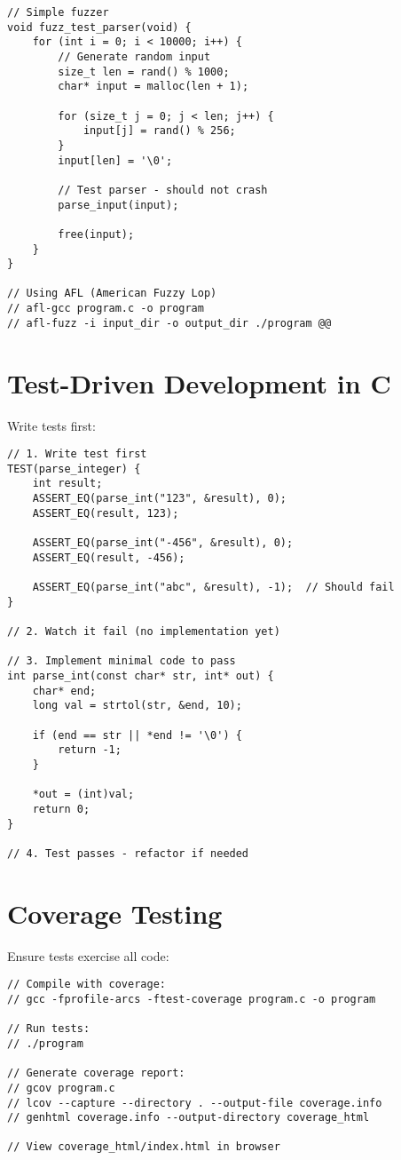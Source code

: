 \begin{lstlisting}
// Simple fuzzer
void fuzz_test_parser(void) {
    for (int i = 0; i < 10000; i++) {
        // Generate random input
        size_t len = rand() % 1000;
        char* input = malloc(len + 1);

        for (size_t j = 0; j < len; j++) {
            input[j] = rand() % 256;
        }
        input[len] = '\0';

        // Test parser - should not crash
        parse_input(input);

        free(input);
    }
}

// Using AFL (American Fuzzy Lop)
// afl-gcc program.c -o program
// afl-fuzz -i input_dir -o output_dir ./program @@
\end{lstlisting}

\section{Test-Driven Development in C}

Write tests first:

\begin{lstlisting}
// 1. Write test first
TEST(parse_integer) {
    int result;
    ASSERT_EQ(parse_int("123", &result), 0);
    ASSERT_EQ(result, 123);

    ASSERT_EQ(parse_int("-456", &result), 0);
    ASSERT_EQ(result, -456);

    ASSERT_EQ(parse_int("abc", &result), -1);  // Should fail
}

// 2. Watch it fail (no implementation yet)

// 3. Implement minimal code to pass
int parse_int(const char* str, int* out) {
    char* end;
    long val = strtol(str, &end, 10);

    if (end == str || *end != '\0') {
        return -1;
    }

    *out = (int)val;
    return 0;
}

// 4. Test passes - refactor if needed
\end{lstlisting}

\section{Coverage Testing}

Ensure tests exercise all code:

\begin{lstlisting}
// Compile with coverage:
// gcc -fprofile-arcs -ftest-coverage program.c -o program

// Run tests:
// ./program

// Generate coverage report:
// gcov program.c
// lcov --capture --directory . --output-file coverage.info
// genhtml coverage.info --output-directory coverage_html

// View coverage_html/index.html in browser
\end{lstlisting}


